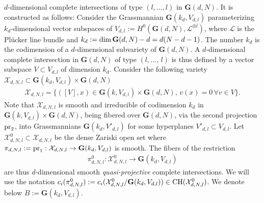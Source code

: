 \documentclass[10pt]{article}
\begin{document}
$d$-dimensional complete intersections of type $(l,\ldots,l)$ in $\mathbf{G}(d,N)$. It is constructed as follows: Consider the Grassmannian $\mathbf{G}(k_d, V_{d,l})$ parameterizing
$k_d$-dimensional vector subspaces of
$V_{d,l}:=H^0(\mathbf{G}(d,N),\mathcal{L}^{\otimes l})$, where $\mathcal{L}$ is the Pl\"ucker line bundle
and $k_d:={\rm dim}\,\mathbf{G}(d,N)-d=d(N-d-1)$. The number $k_d$ is the codimension of a $d$-dimensional subvariety of $\mathbf{G}(d,N)$. A $d$-dimensional complete intersection in $\mathbf{G}(d,N)$ of type $(l,\ldots,\,l)$ is thus defined
by a vector subspace $V\subset V_{d,l}$ of dimension $k_d$.
Consider the following variety
$\mathcal{X}_{d,N,l}\subset \mathbf{G}(k_d, V_{d,l})\times \mathbf{G}(d,N)$
\begin{eqnarray}\label{eqdefXNL}
\mathcal{X}_{d,N,l}=\{([V],x)\in \mathbf{G}(k, V_{d,l})\times \mathbf{G}(d,N),\,v(x)=0\,\forall v\in V\}
.
\end{eqnarray}
Note that $\mathcal{X}_{d,N,l}$ is smooth and irreducible of codimension $k_d$ in $\mathbf{G}(k, V_{d,l})\times \mathbf{G}(d,N)$, being fibered over $\mathbf{G}(d,N)$, via the second projection ${\rm pr}_2$,  into Grassmannians $\mathbf{G}(k_d,V'_{d,l})$ for some hyperplanes
$V'_{d,l}\subset V_{d,l}$. Let
$\mathcal{X}^0_{d,N,l}\subset \mathcal{X}_{d,N,l}$ be the dense Zariski open set where
$\pi_{d,N,l}:={\rm pr}_1:\mathcal{X}_{d,N,l}\rightarrow \mathbf{G}(k_d, V_{d,l})$ is smooth. The fibers of the restriction \begin{eqnarray}\label{eqdefidNl}\pi_{d,N,l}^0:\mathcal{X}^0_{d,N,l}\rightarrow \mathbf{G}(k_d, V_{d,l})\end{eqnarray} are thus $d$-dimensional smooth {\it quasi-projective} complete intersections.
We will use the notation $c_i(\pi_{d,N,l}^0):=c_i(\mathcal{X}^0_{d,N,l}/\mathbf{G}(k_{d}, V_{d,l}))\in{\rm CH}(\mathcal{X}^0_{d,N,l})$.
 We denote below $B:=\mathbf{G}(k_{d},V_{d,l})$.
\end{document}

